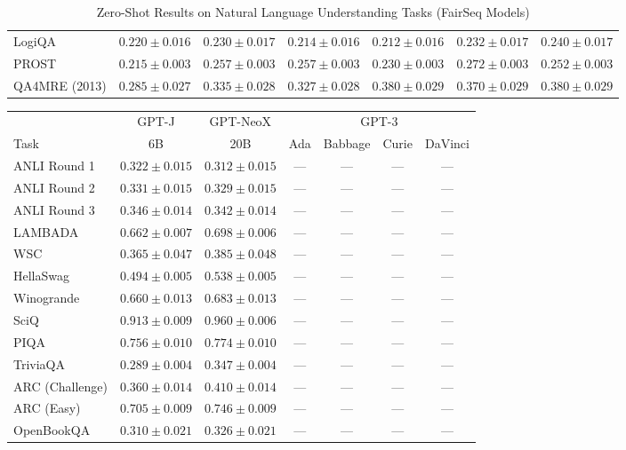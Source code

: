 \documentclass[11pt]{article}
\begin{document}
{\begin{landscape}
\begin{table}
\begin{tabular}{l c c c c c c }
LogiQA & $0.220 \pm 0.016$ & $0.230 \pm 0.017$ & $0.214 \pm 0.016$ & $0.212 \pm 0.016$ & $0.232 \pm 0.017$ & $0.240 \pm 0.017$ \\ 
PROST & $0.215 \pm 0.003$ & $0.257 \pm 0.003$ & $0.257 \pm 0.003$ & $0.230 \pm 0.003$ & $0.272 \pm 0.003$ & $0.252 \pm 0.003$ \\ 
QA4MRE (2013) & $0.285 \pm 0.027$ & $0.335 \pm 0.028$ & $0.327 \pm 0.028$ & $0.380 \pm 0.029$ & $0.370 \pm 0.029$ & $0.380 \pm 0.029$ \\\bottomrule
\end{tabular}
\caption{Zero-Shot Results on Natural Language Understanding Tasks (FairSeq Models)}
\label{tab:nlu_fairseq}
\end{table}

\begin{table}
\centering 
\begin{tabular}{l c c c c c c } \\
 & GPT-J & GPT-NeoX & \multicolumn{4}{c}{GPT-3} \\
Task & 6B & 20B & Ada & Babbage & Curie & DaVinci\\ \toprule
ANLI Round 1 & $0.322 \pm 0.015$ & $0.312 \pm 0.015$ & ---  & --- & --- & --- \\ 
ANLI Round 2 & $0.331 \pm 0.015$ & $0.329 \pm 0.015$ & ---  & --- & --- & --- \\ 
ANLI Round 3 & $0.346 \pm 0.014$ & $0.342 \pm 0.014$ & ---  & --- & --- & --- \\ 
LAMBADA & $0.662 \pm 0.007$ & $0.698 \pm 0.006$ & ---  & --- & --- & --- \\ 
WSC & $0.365 \pm 0.047$ & $0.385 \pm 0.048$ & ---  & --- & --- & --- \\ 
HellaSwag & $0.494 \pm 0.005$ & $0.538 \pm 0.005$ & ---  & --- & --- & --- \\ 
Winogrande & $0.660 \pm 0.013$ & $0.683 \pm 0.013$ & ---  & --- & --- & --- \\ 
SciQ & $0.913 \pm 0.009$ & $0.960 \pm 0.006$ & ---  & --- & --- & --- \\ 
PIQA & $0.756 \pm 0.010$ & $0.774 \pm 0.010$ & ---  & --- & --- & --- \\ 
TriviaQA & $0.289 \pm 0.004$ & $0.347 \pm 0.004$ & ---  & --- & --- & --- \\ 
ARC (Challenge) & $0.360 \pm 0.014$ & $0.410 \pm 0.014$ & ---  & --- & --- & --- \\ 
ARC (Easy) & $0.705 \pm 0.009$ & $0.746 \pm 0.009$ & ---  & --- & --- & --- \\ 
OpenBookQA & $0.310 \pm 0.021$ & $0.326 \pm 0.021$ & ---  & --- & --- & --- \\ 

\end{tabular}
\end{table}
\end{landscape}}
\end{document}
